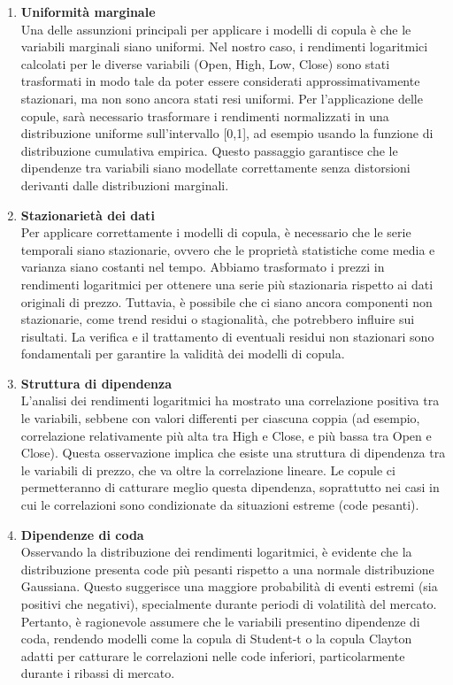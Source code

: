 \documentclass[a4paper,12pt]{article}
\begin{document}
\begin{enumerate}
	\item \textbf{Uniformità marginale}\\
	Una delle assunzioni principali per applicare i modelli di copula è che le variabili marginali siano uniformi. Nel nostro caso, i rendimenti logaritmici calcolati per le diverse variabili (Open, High, Low, Close) sono stati trasformati in modo tale da poter essere considerati approssimativamente stazionari, ma non sono ancora stati resi uniformi. Per l'applicazione delle copule, sarà necessario trasformare i rendimenti normalizzati in una distribuzione uniforme sull'intervallo [0,1], ad esempio usando la funzione di distribuzione cumulativa empirica. Questo passaggio garantisce che le dipendenze tra variabili siano modellate correttamente senza distorsioni derivanti dalle distribuzioni marginali.
	\item \textbf{Stazionarietà dei dati}\\
	Per applicare correttamente i modelli di copula, è necessario che le serie temporali siano stazionarie, ovvero che le proprietà statistiche come media e varianza siano costanti nel tempo. Abbiamo trasformato i prezzi in rendimenti logaritmici per ottenere una serie più stazionaria rispetto ai dati originali di prezzo. Tuttavia, è possibile che ci siano ancora componenti non stazionarie, come trend residui o stagionalità, che potrebbero influire sui risultati. La verifica e il trattamento di eventuali residui non stazionari sono fondamentali per garantire la validità dei modelli di copula.
	\item \textbf{Struttura di dipendenza}\\
	L'analisi dei rendimenti logaritmici ha mostrato una correlazione positiva tra le variabili, sebbene con valori differenti per ciascuna coppia (ad esempio, correlazione relativamente più alta tra High e Close, e più bassa tra Open e Close). Questa osservazione implica che esiste una struttura di dipendenza tra le variabili di prezzo, che va oltre la correlazione lineare. Le copule ci permetteranno di catturare meglio questa dipendenza, soprattutto nei casi in cui le correlazioni sono condizionate da situazioni estreme (code pesanti).
	\item \textbf{Dipendenze di coda}\\
	Osservando la distribuzione dei rendimenti logaritmici, è evidente che la distribuzione presenta code più pesanti rispetto a una normale distribuzione Gaussiana. Questo suggerisce una maggiore probabilità di eventi estremi (sia positivi che negativi), specialmente durante periodi di volatilità del mercato. Pertanto, è ragionevole assumere che le variabili presentino dipendenze di coda, rendendo modelli come la copula di Student-t o la copula Clayton adatti per catturare le correlazioni nelle code inferiori, particolarmente durante i ribassi di mercato.

\end{enumerate}
\end{document}

